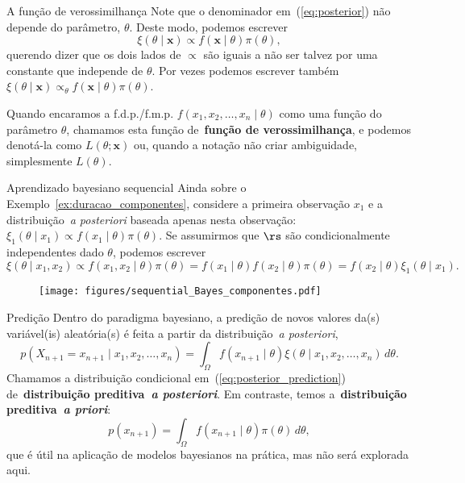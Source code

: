 \begin{frame}{A função de verossimilhança}
 Note que o denominador em~(\ref{eq:posterior}) não depende do parâmetro, $\theta$.
 Deste modo, podemos escrever
 \[ \xi(\theta \mid \boldsymbol{x}) \propto f(\boldsymbol{x} \mid \theta)\pi(\theta), \]
 querendo dizer que os dois lados de $\propto$ são iguais a não ser talvez por uma constante que independe de $\theta$.
 Por vezes podemos escrever também $\xi(\theta \mid \boldsymbol{x}) \propto_\theta f(\boldsymbol{x} \mid \theta)\pi(\theta)$.
 \begin{defn}
 \label{def:likelihood_function}
  Quando encaramos a f.d.p./f.m.p. $f(x_1, x_2, \ldots, x_n \mid \theta)$ como uma função do parâmetro $\theta$, chamamos esta função de~\textbf{função de verossimilhança}, e podemos denotá-la como $L(\theta ; \boldsymbol{x})$ ou, quando a notação não criar ambiguidade, simplesmente $L(\theta)$.
 \end{defn}
\end{frame}
\begin{frame}{Aprendizado bayesiano sequencial}
Ainda sobre o Exemplo~\ref{ex:duracao_componentes}, considere a primeira observação $x_1$ e a distribuição~\textit{a posteriori} baseada apenas nesta observação: $\xi_1(\theta \mid x_1) \propto f(x_1 \mid \theta)\pi(\theta)$.
Se assumirmos que $\rs$ são condicionalmente independentes dado $\theta$, podemos escrever 
\[\xi(\theta \mid x_1, x_2) \propto f(x_1, x_2 \mid \theta)\pi(\theta) = f(x_1 \mid \theta)f(x_2 \mid \theta)\pi(\theta) = f(x_2 \mid \theta)\xi_1(\theta \mid x_1). \]
    \begin{figure}[!ht]
    \label{fig:posterior_componentes_sequencial}
    \begin{center}
    \texttt{[image: figures/sequential\_Bayes\_componentes.pdf]} 
    \end{center} 
    \end{figure} 
\end{frame}
\begin{frame}{Predição}
 Dentro do paradigma bayesiano, a predição de novos valores da(s) variável(is) aleatória(s) é feita a partir da distribuição~\textit{a posteriori},
 \begin{equation}
  \label{eq:posterior_prediction}
  p(X_{n+1} = x_{n+1} \mid x_1, x_2, \ldots, x_n) = \int_{\Omega} f(x_{n+1} \mid \theta)\xi(\theta \mid x_1, x_2, \ldots, x_n)\, d\theta.
 \end{equation}
Chamamos a distribuição condicional em~(\ref{eq:posterior_prediction}) de~\textbf{distribuição preditiva~\textit{a posteriori}}.
Em contraste, temos a~\textbf{distribuição preditiva~\textit{a priori}}:
 \begin{equation}
  \label{eq:prior_prediction}
  p(x_{n+1}) = \int_{\Omega} f(x_{n+1} \mid \theta)\pi(\theta)\, d\theta,
 \end{equation}
que é útil na aplicação de modelos bayesianos na prática, mas não será explorada aqui.
\end{frame}

